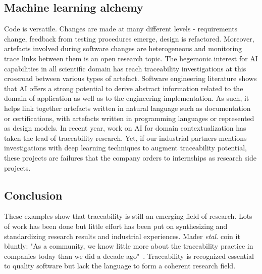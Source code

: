 \subsection{Machine learning alchemy}
Code is versatile. Changes are made at many different levels - requirements change, feedback from testing procedures emerge, design is refactored. Moreover, artefacts involved during software changes are heterogeneous and monitoring trace links between them is an open research topic. 
The hegemonic interest for AI capabilities in all scientific domain has reach traceability investigations at this crossroad between various types of artefact. Software engineering literature shows that AI offers a strong potential to derive abstract information related to the domain of application as well as to the engineering implementation. As such, it helps link together artefacts written in natural language such as documentation or certifications, with artefacts written in programming languages or represented as design models. In recent year, work on AI for domain contextualization has taken the lead of traceability research\cite{clelandhuang2014-traceability-trends-and-futurte-direction,borg2014-SmS-IR-for-traceability}. 
Yet, if our industrial partners mentions investigations with deep learning techniques to augment traceability potential, these projects are failures that the company orders to internships as research side projects.

\subsection{Conclusion}
These examples show that traceability is still an emerging field of research. Lots of work has been done but little effort has been put on synthesizing and standardizing research results and industrial experiences. 
Mader \textit{etal.} coin it bluntly: "As a community, we know little more about the traceability practice in companies today than we did a decade ago"~\cite{mader2009-motivation-matters-in-traceability-practitioner-survey}.
Traceability is recognized essential to quality software but lack the language to form a coherent research field.




